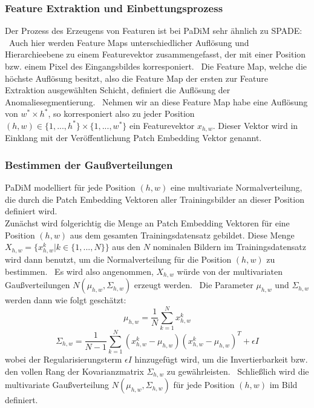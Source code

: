 \subsubsection*{Feature Extraktion und Einbettungsprozess}
Der Prozess des Erzeugens von Featuren ist bei PaDiM sehr ähnlich zu SPADE: \
Auch hier werden Feature Maps unterschiedlicher Auflösung und Hierarchieebene zu einem Featurevektor zusammengefasst, der mit einer Position bzw. einem Pixel des Eingangsbildes korresponiert. \
Die Feature Map, welche die höchste Auflösung besitzt, also die Feature Map der ersten zur Feature Extraktion ausgewählten Schicht, definiert die Auflösung der Anomaliesegmentierung. \
Nehmen wir an diese Feature Map habe eine Auflösung von $w^{*}\times h^{*}$, so korresponiert also zu jeder Position $(h,w)\in \{1,...,h^{*}\}\times \{1,...,w^{*}\}$ ein Featurevektor $x_{h,w}$.
Dieser Vektor wird in Einklang mit der Veröffentlichung \glqq Patch Embedding Vektor\grqq{} genannt. \\
\subsubsection{Bestimmen der Gaußverteilungen}
PaDiM modelliert für jede Position $(h,w)$ eine multivariate Normalverteilung, die durch die Patch Embedding Vektoren aller Trainingsbilder an dieser Position definiert wird. \\
Zunächst wird folgerichtig die Menge an Patch Embedding Vektoren für eine Position $(h,w)$ aus dem gesamten Trainingsdatensatz gebildet. Diese Menge \
$X_{h,w} = \{ {x_{h,w}^{k} | k\in \{1,...,N\}} \}$ aus den $N$ nominalen Bildern im Trainingsdatensatz wird dann benutzt, um die Normalverteilung für die Position $(h,w)$ zu bestimmen. \
Es wird also angenommen, $X_{h,w}$ würde von der multivariaten Gaußverteilungen $N(\mu_{h,w}, \Sigma_{h,w})$ erzeugt werden. \
Die Parameter $\mu_{h,w}$ und $\Sigma_{h,w}$ werden dann wie folgt geschätzt: \
$$
\mu_{h,w} = \frac{1}{N} \sum_{k=1}^{N} x_{h,w}^{k}
$$
$$
\Sigma_{h,w} = \frac{1}{N-1} \sum_{k=1}^{N} (x_{h,w}^{k} - \mu_{h,w})(x_{h,w}^{k} - \mu_{h,w})^{T} + \epsilon I
$$
wobei der Regularisierungsterm $\epsilon I$ hinzugefügt wird, um die Invertierbarkeit bzw. den vollen Rang der Kovarianzmatrix $\Sigma_{h,w}$ zu gewährleisten. \
Schließlich wird die multivariate Gaußverteilung $N(\mu_{h,w}, \Sigma_{h,w})$ für jede Position $(h,w)$ im Bild definiert.\
